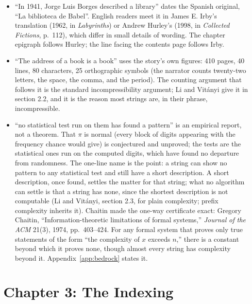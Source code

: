 \begin{itemize}
\setlength{\itemsep}{0.5em}
\item ``In 1941, Jorge Luis Borges described a library'' dates the Spanish original, ``La biblioteca de Babel''. English readers meet it in James E. Irby's translation (1962, in \textit{Labyrinths}) or Andrew Hurley's (1998, in \textit{Collected Fictions}, p.~112), which differ in small details of wording. The chapter epigraph follows Hurley; the line facing the contents page follows Irby.
\item ``The address of a book is a book'' uses the story's own figures: 410 pages, 40 lines, 80 characters, 25 orthographic symbols (the narrator counts twenty-two letters, the space, the comma, and the period). The counting argument that follows it is the standard incompressibility argument; Li and Vit\'anyi give it in section 2.2, and it is the reason most strings are, in their phrase, incompressible.
\item ``no statistical test run on them has found a pattern'' is an empirical report, not a theorem. That $\pi$ is normal (every block of digits appearing with the frequency chance would give) is conjectured and unproved; the tests are the statistical ones run on the computed digits, which have found no departure from randomness. The one-line name is the point: a string can show no pattern to any statistical test and still have a short description. A short description, once found, settles the matter for that string; what no algorithm can settle is that a string has none, since the shortest description is not computable (Li and Vit\'anyi, section 2.3, for plain complexity; prefix complexity inherits it). Chaitin made the one-way certificate exact: Gregory Chaitin, ``Information-theoretic limitations of formal systems,'' \textit{Journal of the ACM} 21(3), 1974, pp.~403--424. For any formal system that proves only true statements of the form ``the complexity of $x$ exceeds $n$,'' there is a constant beyond which it proves none, though almost every string has complexity beyond it. Appendix~\ref{app:bedrock} states it.
\end{itemize}

\section*{Chapter 3: The Indexing}

